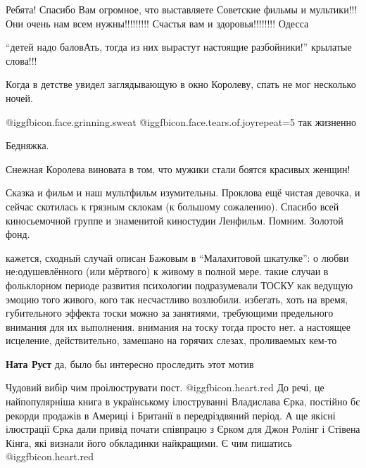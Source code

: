 \begin{itemize}
\begin{multicols}{2}

Ребята! Спасибо Вам огромное, что выставляете Советские фильмы и мультики!!!
Они очень нам всем нужны!!!!!!!!! Счастья вам и здоровья!!!!!!!! Одесса


\enquote{детей надо баловАть, тогда из них вырастут  настоящие разбойники!}  крылатые
слова!!!

Когда  в детстве увидел заглядывающую в окно Королеву, спать не мог несколько ночей.

\begin{itemize} %
 @igg{fbicon.face.grinning.sweat}  @igg{fbicon.face.tears.of.joy}{repeat=5} так жизненно

Бедняжка.

Снежная Королева виновата в том, что мужики стали боятся красивых женщин!
\end{itemize} %


Сказка и фильм и наш мультфильм изумительны. Проклова ещё чистая девочка, и
сейчас скотилась к грязным склокам (к большому сожалению). Спасибо всей
киносьемочной группе и знаменитой киностудии Ленфильм. Помним. Золотой фонд.

\end{multicols}

\zzrule


кажется, сходный случай описан Бажовым в \enquote{Малахитовой шкатулке}: о любви
не:одушевлённого (или мёртвого) к живому в полной мере. такие случаи в
фольклорном периоде развития психологии подразумевали ТОСКУ как ведущую эмоцию
того живого, кого так несчастливо возлюбили. избегать, хоть на время,
губительного эффекта тоски можно за занятиями, требующими предельного внимания
для их выполнения. внимания на тоску тогда просто нет. а настоящее исцеление,
действительно, замешано на горячих слезах, проливаемых кем-то

\begin{itemize} %
\textbf{Ната Руст} да, было бы интересно проследить этот мотив
\end{itemize} %


Чудовий вибір чим проілюструвати пост. @igg{fbicon.heart.red} До речі, це найпопулярніша книга в
українському ілюструванні Владислава Єрка, постійно бє рекорди продажів в
Америці і Британії в передріздвяний період. А ще якісні ілюстрації Єрка дали
привід почати співпрацю з Єрком для Джон Ролінг і Стівена Кінга, які визнали
його обкладинки найкращими. Є чим пишатись @igg{fbicon.heart.red}


\end{itemize}
